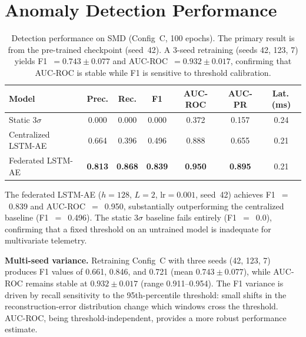 \section{Anomaly Detection Performance}
\label{sec:eval_detection}

\begin{table}[H]
    \centering
    \small
    \begin{tabular}{|l|c|c|c|c|c|c|}
        \hline
        \textbf{Model} & \textbf{Prec.} & \textbf{Rec.} & \textbf{F1}
        & \textbf{AUC-ROC} & \textbf{AUC-PR} & \textbf{Lat.\,(ms)} \\
        \hline
        Static 3$\sigma$ & 0.000 & 0.000 & 0.000 & 0.372 & 0.157 & 0.24 \\
        \hline
        Centralized LSTM-AE & 0.664 & 0.396 & 0.496 & 0.888 & 0.655 & 0.21 \\
        \hline
        Federated LSTM-AE & \textbf{0.813} & \textbf{0.868} & \textbf{0.839}
        & \textbf{0.950} & \textbf{0.895} & 0.21 \\
        \hline
    \end{tabular}
    \caption{Detection performance on SMD (Config~C, 100 epochs). The
             primary result is from the pre-trained checkpoint (seed~42).
             A 3-seed retraining (seeds 42, 123, 7) yields
             F1~$= 0.743 \pm 0.077$ and
             AUC-ROC~$= 0.932 \pm 0.017$,
             confirming that AUC-ROC is stable while F1 is
             sensitive to threshold calibration.}
    \label{tab:detection_results}
\end{table}

The federated LSTM-AE ($h{=}128$, $L{=}2$, $\text{lr}{=}0.001$, seed~42)
achieves F1~$=$~0.839 and AUC-ROC~$=$~0.950, substantially outperforming the
centralized baseline (F1~$=$~0.496). The static 3$\sigma$ baseline fails
entirely (F1~$=$~0.0), confirming that a fixed threshold on an untrained model
is inadequate for multivariate telemetry.

\textbf{Multi-seed variance.} Retraining Config~C with three seeds (42, 123,
7) produces F1 values of 0.661, 0.846, and 0.721
(mean $0.743 \pm 0.077$), while AUC-ROC remains stable at
$0.932 \pm 0.017$ (range 0.911--0.954). The F1 variance is driven by recall
sensitivity to the 95th-percentile threshold: small shifts in the
reconstruction-error distribution change which windows cross the threshold.
AUC-ROC, being threshold-independent, provides a more robust performance
estimate.


